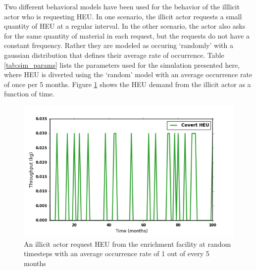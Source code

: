 Two different behavioral models have been used for the behavior of the illlicit actor who is requesting \gls{HEU}. In one scenario, the illicit actor requests a small quantity of \gls{HEU} at a regular interval.  In the other scenario, the actor also asks for the same quantity of material in each request, but the requests do not have a constant frequency. Rather they are modeled as occuring `randomly' with a gaussian distribution that defines their average rate of occurrence.
Table \ref{tab:sim_params} lists the parameters used for the simulation presented here, where \gls{HEU} is diverted using the `random' model with an average occurrence rate of once per 5 months.  Figure \ref{fig:heu_demand} shows the \gls{HEU} demand from the illicit actor as a function of time.  

\begin{figure}
\begin{center}
\includegraphics[natwidth=162bp,natheight=227bp, scale=0.7]{./figs/HEU_R5.png}
\end{center}
\caption{An illicit actor request \gls{HEU} from the enrichment facility at random timesteps with an average occurrence rate of 1 out of every 5 months}
\label{fig:heu_demand}
\end{figure}

